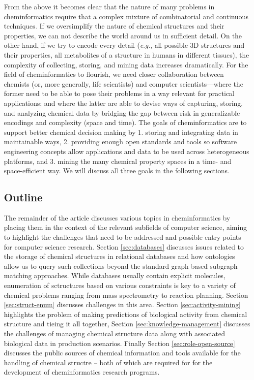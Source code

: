 \documentclass{sig-alternate}
\begin{document}
From the above it becomes clear that the nature of many problems in
cheminformatics require that a complex mixture of combinatorial and
continuous techniques.  If we oversimplify the nature of chemical
structures and their properties, we can not describe the world around
us in sufficient detail. On the other hand, if we try to encode every
detail (\emph{e.g.}, all possible 3D structures and their properties,
all metabolites of a structure in humans in different tissues), the
complexity of collecting, storing, and mining data increases
dramatically. For the field of cheminformatics to flourish, we need
closer collaboration between chemists (or, more generally, life
scientists) and computer scientists---where the former need to be able
to pose their problems in a way relevant for practical applications;
and where the latter are able to devise ways of capturing, storing,
and analyzing chemical data by bridging the gap between risk in
generalizable encodings and complexity (space and time). The goals of
cheminformatics are to support better chemical decision making by
1. storing and integrating data in maintainable ways, 2.  providing
enough open standards and tools so software engineering concepts allow
applications and data to be used across heterogeneous platforms, and
3. mining the many chemical property spaces in a time- and
space-efficient way. We will discuss all three goals in the following
sections.

\subsection{Outline}
\label{sec:outline}


The remainder of the article discusses various topics in
cheminformatics by placing them in the context of the relevant
subfields of computer science, aiming to highlight the challenges that
need to be addressed and possible entry points for computer science
research. Section \ref{sec:databases} discusses issues related to the
storage of chemical structures in relational databases and how
ontologies allow us to query such collections beyond the standard
graph based subgraph matching approaches. While databases usually
contain explicit molecules, enumeration of sctructures based on
various constraints is key to a variety of chemical problems ranging
from mass spectrometry to reaction planning. Section
\ref{sec:struct-enum} discusses challenges in this area. Section
\ref{sec:activity-mining} highlights the problem of making predictions
of biological activity from chemical structure and tieing it all
together, Section \ref{sec:knowledge-management} discusses the
challenges of managing chemical structure data along with associated
biological data in production scenarios. Finally Section
\ref{sec:role-open-source} discusses the public sources of chemical
information and tools available for the handling of chemical structre
-- both of which are required for for the development of
cheminformatics research programs.
\end{document}
